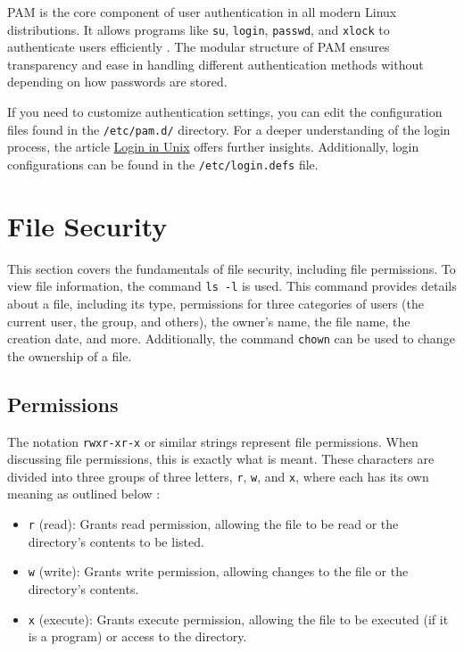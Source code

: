 \documentclass[conference]{IEEEtran}
\begin{document}
PAM is the core component of user authentication in all modern Linux distributions. It allows programs like \texttt{su}, \texttt{login}, \texttt{passwd}, and \texttt{xlock} to authenticate users efficiently \cite{tldp-authentication}. The modular structure of PAM ensures transparency and ease in handling different authentication methods without depending on how passwords are stored.

If you need to customize authentication settings, you can edit the configuration files found in the \texttt{/etc/pam.d/} directory. For a deeper understanding of the login process, the article \href{https://www.computerhope.com/unix/ulogin.htm}{Login in Unix} offers further insights. Additionally, login configurations can be found in the \texttt{/etc/login.defs} file.


\section{File Security}

This section covers the fundamentals of file security, including file permissions. To view file information, the command \texttt{ls -l} is used. This command provides details about a file, including its type, permissions for three categories of users (the current user, the group, and others), the owner's name, the file name, the creation date, and more. Additionally, the command \texttt{chown} can be used to change the ownership of a file.

\subsection{Permissions}

The notation \texttt{rwxr-xr-x} or similar strings represent file permissions. When discussing file permissions, this is exactly what is meant. These characters are divided into three groups of three letters, \texttt{r}, \texttt{w}, and \texttt{x}, where each has its own meaning as outlined below \cite{geeksforgeeks-acl}:

\begin{itemize}
    \item \texttt{r} (read): Grants read permission, allowing the file to be read or the directory's contents to be listed.
    \item \texttt{w} (write): Grants write permission, allowing changes to the file or the directory's contents.
    \item \texttt{x} (execute): Grants execute permission, allowing the file to be executed (if it is a program) or access to the directory.
\end{itemize}
\end{document}
